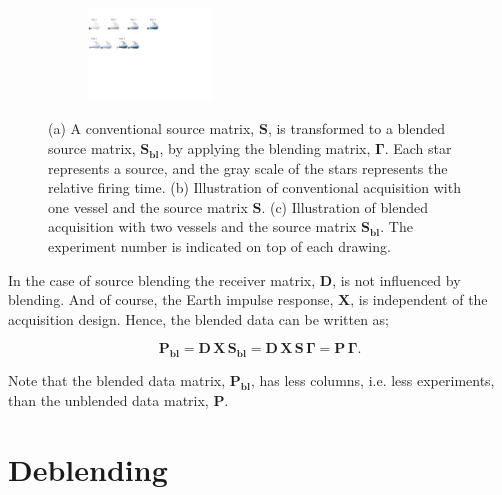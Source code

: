 \begin{figure}
\begin{subfigure}[t]{\textwidth}
	\caption{}
	\label{fig:Ch-Theory-BlendedSource-Conventional}
	\end{subfigure}
	\par\bigskip
	\begin{subfigure}[t]{\textwidth}
	\centering
	\includegraphics[width=0.36\textwidth]{Plots/Blended-Source-New}
	\caption{}
	\label{fig:Ch-Theory-BlendedSource-Blended}
	\end{subfigure}
	
	\caption{(a) A conventional source matrix, $\mathbf{S}$, is transformed to a blended source matrix, $\mathbf{S_{bl}}$, by applying the blending matrix, $\mathbf{\Gamma}$. Each star represents a source, and the gray scale of the stars represents the relative firing time. (b) Illustration of conventional acquisition with one vessel and the source matrix $\mathbf{S}$. (c) Illustration of blended acquisition with two vessels and the source matrix $\mathbf{S_{bl}}$. The experiment number is indicated on top of each drawing.}
	\label{fig:Ch-Theory-BlendedSource}
	
\end{figure}

In the case of source blending the receiver matrix, $\mathbf{D}$, is not influenced by blending. And of course, the Earth impulse response, $\mathbf{X}$, is independent of the acquisition design. Hence, the blended data can be written as;

\begin{equation}
	\mathbf{P_{bl}} = \mathbf{D} \, \mathbf{X} \, \mathbf{S_{bl}} = \mathbf{D} \, \mathbf{X} \, \mathbf{S} \, \mathbf{\Gamma} = \mathbf{P \, \Gamma}.
	\label{eq:Ch-Theory-BlendedData}
\end{equation}

Note that the blended data matrix, $\mathbf{P_{bl}}$, has less columns, i.e. less experiments, than the unblended data matrix, $\mathbf{P}$.



\section{Deblending} \label{sec:MahdadMethod}

